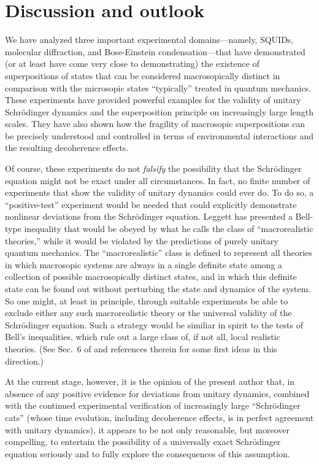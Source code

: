 \documentclass[twocolumn,aps,floatfix,amsmath,amssymb,showpacs,nofootinbib]{revtex4}
\begin{document}
\section{Discussion and outlook} \label{sec:discussion}

We have analyzed three important experimental domains---namely,
SQUIDs, molecular diffraction, and Bose-Einstein condensation---that
have demonstrated (or at least have come very close to demonstrating)
the existence of superpositions of states that can be considered
macrosopically distinct in comparison with the microsopic states
``typically'' treated in quantum mechanics. These experiments have
provided powerful examples for the validity of unitary Schr\"odinger
dynamics and the superposition principle on increasingly large length
scales. They have also shown how the fragility of macrosopic
superpositions can be precisely understood and controlled in terms of
environmental interactions and the resulting decoherence effects.

Of course, these experiments do not {\em falsify} the possibility that
the Schr\"odinger equation might not be exact under all circumstances.
In fact, no finite number of experiments that show the validity of
unitary dynamics could ever do. To do so, a ``positive-test''
experiment would be needed that could explicitly demonstrate nonlinear
deviations from the Schr\"odinger equation.  Leggett
\cite{Leggett:1980:yt,Leggett:2002:uy} has presented a Bell-type
inequality that would be obeyed by what he calls the class of
``macrorealistic theories,'' while it would be violated by the
predictions of purely unitary quantum mechanics. The
``macrorealistic'' class is defined to represent all theories in which
macrosopic systems are always in a single definite state among a
collection of possible macrosopically distinct states, and in which
this definite state can be found out without perturbing the state and
dynamics of the system.  So one might, at least in principle, through
suitable experiments be able to exclude either any such macrorealistic
theory or the universal validity of the Schr\"odinger equation. Such a
strategy would be similiar in spirit to the tests of Bell's
inequalities, which rule out a large class of, if not all, local
realistic theories.  (See Sec.~6 of \cite{Leggett:2002:uy} and
references therein for some first ideas in this direction.)

At the current stage, however, it is the opinion of the present author
that, in  absence of any positive evidence for deviations from
unitary dynamics, combined with the continued experimental
verification of increasingly large ``Schr\"odinger cats'' (whose time
evolution, including decoherence effects, is in perfect agreement with
unitary dynamics), it appears to be not only reasonable, but moreover
compelling, to entertain the possibility of a universally exact
Schr\"odinger equation seriously and to fully explore the consequences
of this assumption.
\end{document}
